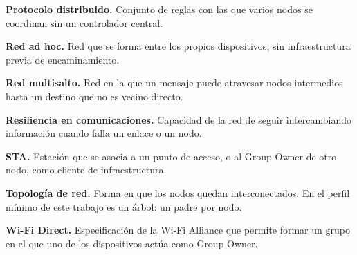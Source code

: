 \documentclass[12pt,oneside]{scrreprt}
\begin{document}
\textbf{Protocolo distribuido.} Conjunto de reglas con las que varios nodos se coordinan sin un controlador central.

\textbf{Red ad hoc.} Red que se forma entre los propios dispositivos, sin infraestructura previa de encaminamiento.

\textbf{Red multisalto.} Red en la que un mensaje puede atravesar nodos intermedios hasta un destino que no es vecino directo.

\textbf{Resiliencia en comunicaciones.} Capacidad de la red de seguir intercambiando información cuando falla un enlace o un nodo.

\textbf{STA.} Estación que se asocia a un punto de acceso, o al Group Owner de otro nodo, como cliente de infraestructura.

\textbf{Topología de red.} Forma en que los nodos quedan interconectados. En el perfil mínimo de este trabajo es un árbol: un padre por nodo.

\textbf{Wi-Fi Direct.} Especificación de la Wi-Fi Alliance que permite formar un grupo en el que uno de los dispositivos actúa como Group Owner.

\clearpage
\singlespacing
\pagestyle{empty}
\printbibliography[title={Referencias Bibliográficas}, heading=bibintoc]
\end{document}

